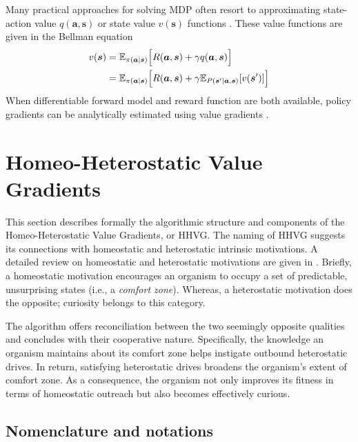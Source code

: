 \documentclass[utf8]{frontiersSCNS}
\newcommand{\bs}{\boldsymbol}
\begin{document}
Many practical approaches for solving MDP often resort to approximating state-action value $q(\bs{a}, \bs{s})$ or state value $v(\bs{s})$ functions \citep{sutton1998reinforcement, deepmind2013atari, deepmind2015lillicrap, svg}. These value functions are given in the Bellman equation
%
	\begin{equation}
	\begin{aligned} \label{eq:bellman}
	v(\bs{s}) 
	&=
	\mathbb{E}_{\pi(\bs{a}|\bs{s})} 
	\Bigl[ R(\bs{a}, \bs{s}) + \gamma q(\bs{a}, \bs{s}) \Bigr] \\
	&=
	\mathbb{E}_{\pi(\bs{a}|\bs{s})} 
	\Bigl[ R(\bs{a}, \bs{s}) + \gamma \mathbb{E}_{P(\bs{s}^\prime|\bs{a}, \bs{s})} [v(\bs{s}^\prime)] \Bigr]
	\end{aligned}
	\end{equation}
%
When differentiable forward model and reward function are both available, policy gradients can be analytically estimated using value gradients \citep{2012fairbank, svg}.


\section{Homeo-Heterostatic Value Gradients} \label{sec:algorithm}

This section describes formally the algorithmic structure and components of the Homeo-Heterostatic Value Gradients, or HHVG. The naming of HHVG suggests its connections with homeostatic and heterostatic intrinsic motivations. A detailed review on homeostatic and heterostatic motivations are given in \cite{intrinsicmotiv}. Briefly, a homeostatic motivation encourages an organism to occupy a set of predictable, unsurprising states (i.e., a {\it comfort zone}). Whereas, a heterostatic motivation does the opposite; curiosity belongs to this category. 

The algorithm offers reconciliation between the two seemingly opposite qualities and concludes with their cooperative nature. Specifically, the knowledge an organism maintains about its comfort zone helps instigate outbound heterostatic drives. In return, satisfying heterostatic drives broadens the organism's extent of comfort zone. As a consequence, the organism not only improves its fitness in terms of homeostatic outreach but also becomes effectively curious.

\subsection{Nomenclature and notations} \label{subsec:notation}
\end{document}
